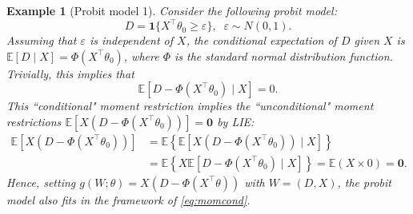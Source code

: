 \documentclass[10.5pt, A4paper, openany, uplatex]{book}
\newcommand{\mbf}{\mathbf}
\newcommand{\eps}{\varepsilon}
\newcommand{\E}{\mathbb{E}}
\newtheorem{example}[theorem]{Example}
\numberwithin{equation}{section}
\begin{document}
\begin{example}[Probit model 1]\upshape\label{ex:probit}
	Consider the following probit model:
	\[
		D = \mbf{1}\{X^\top\theta_0 \geq \eps\}, \;\; \eps \sim N(0,1).
	\]
	Assuming that $\eps$ is independent of $X$, the conditional expectation of $D$ given $X$ is $\E [D \mid X] = \Phi(X^\top \theta_0)$, where $\Phi$ is the standard normal distribution function.
	Trivially, this implies that
	\[
		\E[D -  \Phi(X^\top \theta_0) \mid X] = 0.
	\]
	This ``conditional" moment restriction implies the ``unconditional" moment restrictions $\E [X (D -  \Phi(X^\top \theta_0))] = \mbf{0}$ by LIE:
	\begin{align*}
	\E [X (D -  \Phi(X^\top \theta_0))] 
	& = \E \left\{ \E[X (D -  \Phi(X^\top \theta_0)) \mid X] \right\} \\
	& = \E \left\{ X \E[ D -  \Phi(X^\top \theta_0) \mid X] \right\} = \E \left( X \times 0 \right) = \mbf{0}.
	\end{align*}
	Hence, setting $g(W; \theta) = X (D -  \Phi(X^\top \theta))$ with $W = (D,X)$, the probit model also fits in the framework of \eqref{eq:momcond}.
\end{example}
\end{document}
